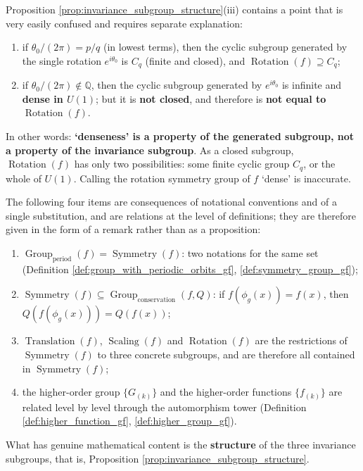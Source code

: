 \begin{remark}\label{rem:rotation_dense_corrected}
Proposition \ref{prop:invariance_subgroup_structure}(iii) contains a point that is very easily confused and requires separate explanation:
\begin{enumerate}[label=(\roman*)]
    \item if $\theta_0/(2\pi)=p/q$ (in lowest terms), then the cyclic subgroup generated by the single rotation $e^{i\theta_0}$ is $C_q$ (finite and closed), and $\operatorname{Rotation}(f)\supseteq C_q$;
    \item if $\theta_0/(2\pi)\notin\mathbb{Q}$, then the cyclic subgroup generated by $e^{i\theta_0}$ is infinite and \textbf{dense in $U(1)$}; but it is \textbf{not closed}, and therefore is \textbf{not equal to} $\operatorname{Rotation}(f)$.
\end{enumerate}
In other words: \textbf{`denseness' is a property of the generated subgroup, not a property of the invariance subgroup}. As a closed subgroup, $\operatorname{Rotation}(f)$ has only two possibilities: some finite cyclic group $C_q$, or the whole of $U(1)$. Calling the rotation symmetry group of $f$ `dense' is inaccurate.
\end{remark}

\begin{remark}\label{rem:concept_pair_relations}
The following four items are consequences of notational conventions and of a single substitution, and are relations at the level of definitions; they are therefore given in the form of a remark rather than as a proposition:
\begin{enumerate}[label=(\roman*)]
    \item $\operatorname{Group}_{\mathrm{period}}(f)=\operatorname{Symmetry}(f)$: two notations for the same set (Definition \ref{def:group_with_periodic_orbits_gf}, \ref{def:symmetry_group_gf});
    \item $\operatorname{Symmetry}(f)\subseteq\operatorname{Group}_{\mathrm{conservation}}(f,Q)$: if $f(\phi_g(x))=f(x)$, then $Q(f(\phi_g(x)))=Q(f(x))$;
    \item $\operatorname{Translation}(f)$, $\operatorname{Scaling}(f)$ and $\operatorname{Rotation}(f)$ are the restrictions of $\operatorname{Symmetry}(f)$ to three concrete subgroups, and are therefore all contained in $\operatorname{Symmetry}(f)$;
    \item the higher-order group $\{G_{(k)}\}$ and the higher-order functions $\{f_{(k)}\}$ are related level by level through the automorphism tower (Definition \ref{def:higher_function_gf}, \ref{def:higher_group_gf}).
\end{enumerate}
What has genuine mathematical content is the \textbf{structure} of the three invariance subgroups, that is, Proposition \ref{prop:invariance_subgroup_structure}.
\end{remark}

